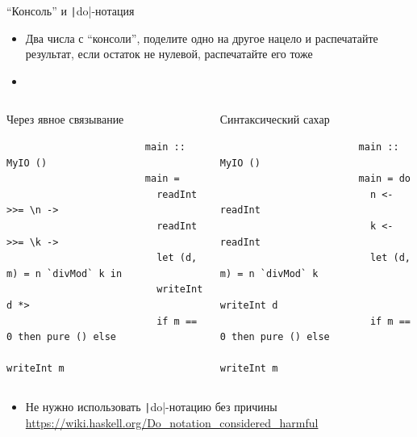     \begin{frame}[fragile]{``Консоль'' и \texttt|do|-нотация}
        \begin{itemize}
            \item[\todo] Два числа с ``консоли'', поделите одно на другое нацело и распечатайте результат, если остаток не нулевой, распечатайте его тоже
            \item[\answer]
        \end{itemize}
        \vspace{-1.7em}
        \begin{columns}[onlytextwidth]
            \begin{column}[t]{0.485\textwidth}
                \pause
                \begin{block}{Через явное связывание}
                    \begin{verbatim}
                        main :: MyIO ()
                        main =
                          readInt >>= \n ->
                          readInt >>= \k ->
                          let (d, m) = n `divMod` k in
                          writeInt d *>
                          if m == 0 then pure () else
                            writeInt m
                    \end{verbatim}
                \end{block}
            \end{column}\hfill%
            \begin{column}[t]{0.485\textwidth}
                \pause
                \begin{block}{Синтаксический сахар}
                    \begin{verbatim}
                        main :: MyIO ()
                        main = do
                          n <- readInt
                          k <- readInt
                          let (d, m) = n `divMod` k
                          writeInt d
                          if m == 0 then pure () else
                            writeInt m
                    \end{verbatim}
                \end{block}
            \end{column}
        \end{columns}
        \vspace{0.5em}
        \begin{itemize}
            \item Не нужно использовать \texttt|do|-нотацию без причины\\ {\color{blue} \url{https://wiki.haskell.org/Do_notation_considered_harmful}}
        \end{itemize}
    \end{frame}

